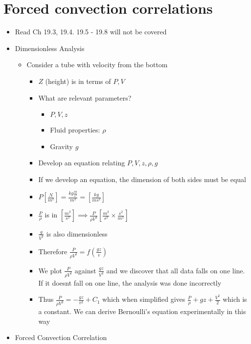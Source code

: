 \documentclass[12pt]{article}
\begin{document}
\section{Forced convection correlations} \begin{itemize}
    \item Read Ch 19.3, 19.4. 19.5 - 19.8 will not be covered
    \item Dimensionless Analysis \begin{itemize}
        \item Consider a tube with velocity from the bottom \begin{itemize}
            \item $Z$ (height) is in terms of $P, V$
            \item What are relevant parameters? \begin{itemize}
                \item $P, V, z$
                \item Fluid properties: $\rho$
                \item Gravity $g$
            \end{itemize}
            \item Develop an equation relating $P, V, z, \rho, g$
            \item If we develop an equation, the dimension of both sides must be equal
            \item $P [\frac{N}{m^2}] = \frac{ kg \frac{m}{s^2} }{m^2} = [\frac{kg}{ms^2}]$
            \item $\frac{P}{\rho}$ is in $ [ \frac{m^2}{s^2}] \implies \frac{P}{\rho V^2} [\frac{m^2}{s^2} \times \frac{s^2}{m^2}]$
            \item $\frac{g}{V^2}$ is also dimensionless
            \item Therefore $\frac{P}{\rho V^2} = f \left(\frac{gz}{v} \right)$
            \item We plot $\frac{P}{\rho V^2}$ against $\frac{gz}{V^2}$ and we discover that all data falls on one line. If it doesnt fall on one line, the analysis was done incorrectly
            \item Thus $\frac{P}{\rho V^2} = - \frac{gz}{v^2} + C_1$ which when simplified gives $\frac{P}{\rho} + gz + \frac{V^2}{2}$ which is a constant. We can derive Bernoulli's equation experimentally in this way
        \end{itemize}
    \end{itemize}
    \item Forced Convection Correlation \begin{itemize}

\end{itemize}
\end{itemize}
\end{document}

